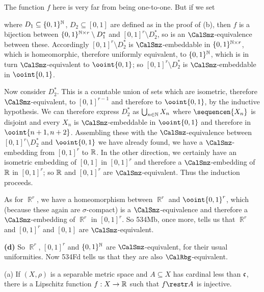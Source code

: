 {The function $f$ here is very far from being one-to-one.   But if we
set



\noindent where $D_1\subseteq\{0,1\}^{\Bbb N}$, $D_2\subseteq[0,1]$
are defined as in the proof of (b), then $f$ is a bijection between
$\{0,1\}^{\Bbb N\times r}\setminus D^*_1$ and
$[0,1]^r\setminus D^*_2$,
so is an $\CalSmz$-equivalence between these.   Accordingly
$[0,1]^r\setminus D^*_2$ is $\CalSmz$-embeddable in
$\{0,1\}^{\Bbb N\times r}$, which is homeomorphic, therefore uniformly
equivalent, to $\{0,1\}^{\Bbb N}$, which is in turn
$\CalSmz$-equivalent
to $\ooint{0,1}$;  so  $[0,1]^r\setminus D^*_2$ is
$\CalSmz$-embeddable in $\ooint{0,1}$.

Now consider $D_2^*$.   This is a countable union of sets which are
isometric, therefore $\CalSmz$-equivalent, to $[0,1]^{r-1}$ and
therefore to $\ooint{0,1}$, by the inductive hypothesis.   We can
therefore express $D_2^*$ as $\bigcup_{n\in\Bbb N}X_n$ where
$\sequencen{X_n}$ is disjoint and every $X_n$ is $\CalSmz$-embeddable
in $\ooint{0,1}$ and therefore in $\ooint{n+1,n+2}$.   Assembling these
with the $\CalSmz$-equivalence between $[0,1]^r\setminus D_2^*$ and
$\ooint{0,1}$ we have already found, we have a $\CalSmz$-embedding
from $[0,1]^r$ to $\Bbb R$.   In the other direction, we certainly have an
isometric embedding of $[0,1]$ in $[0,1]^r$ and therefore a
$\CalSmz$-embedding of $\Bbb R$ in $[0,1]^r$;  so $\Bbb R$ and
$[0,1]^r$ are $\CalSmz$-equivalent.   Thus the induction proceeds.

\medskip

 As for $\BbbR^r$, we have a homeomorphism between
$\BbbR^r$ and $\ooint{0,1}^r$, which (because these again are
$\sigma$-compact) is a $\CalSmz$-equivalence and therefore a
$\CalSmz$-embedding of $\BbbR^r$ in $[0,1]^r$.   So 534Mb, once more,
tells us that $\BbbR^r$ and $[0,1]^r$ and $[0,1]$ are
$\CalSmz$-equivalent.

\medskip

{\bf (d)} So $\BbbR^r$, $[0,1]^r$ and
$\{0,1\}^{\Bbb N}$ are $\CalSmz$-equivalent, for their usual
uniformities.
Now 534Fd tells us that they are also $\CalRbg$-equivalent.
}%

 (a) If $(X,\rho)$ is a separable metric
space and
$A\subseteq X$ has cardinal less than $\frak c$, there is a Lipschitz
function $f:X\to\Bbb R$ such that $f\restr A$ is injective.

